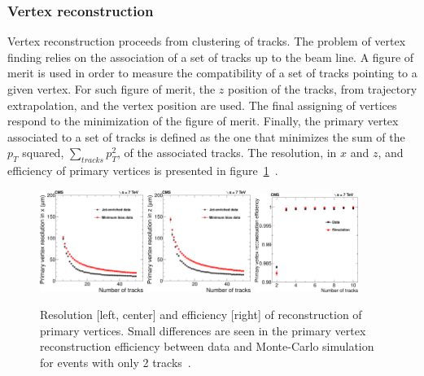 \subsubsection{Vertex reconstruction}

Vertex reconstruction proceeds from clustering of tracks. The problem of vertex finding relies on the association of a set of tracks up to the beam line. A figure of merit is used in order to measure the compatibility of a set of tracks pointing to a given vertex. For such figure of merit, the $z$ position of the tracks, from trajectory extrapolation, and the vertex position are used. The final assigning of vertices respond to the minimization of the figure of merit. Finally, the primary vertex associated to a set of tracks is defined as the one that minimizes the sum of the $p_{T}$ squared, $\sum_{tracks}p_{T}^{2}$, of the associated tracks. The resolution, in $x$ and $z$, and efficiency of primary vertices is presented in figure~\ref{fig:VertexRec}~\cite{Chatrchyan:2014fea}.

\begin{figure}[!Hhtbp]
  \begin{center}
    \includegraphics[width=0.3\textwidth]{figs/PrimaryVertexResolutionX.png}
    \includegraphics[width=0.3\textwidth]{figs/PrimaryVertexResolutionZ.png}
    \includegraphics[width=0.3\textwidth]{figs/PrimaryVertexTagAndProbeEfficiency.png}
    \caption{Resolution [left, center] and efficiency [right] of reconstruction of primary vertices. Small differences are seen in the primary vertex reconstruction efficiency between data and Monte-Carlo simulation for events with only 2 tracks~\cite{Chatrchyan:2014fea}.}
    \label{fig:VertexRec}
  \end{center}
\end{figure}

